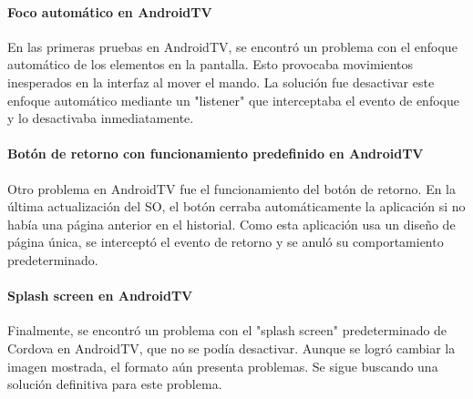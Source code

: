 \paragraph{Foco automático en AndroidTV}
En las primeras pruebas en AndroidTV, se encontró un problema con el enfoque automático de los elementos en la pantalla. 
Esto provocaba movimientos inesperados en la interfaz al mover el mando. La solución fue desactivar este enfoque 
automático mediante un "listener" que interceptaba el evento de enfoque y lo desactivaba inmediatamente.

\paragraph{Botón de retorno con funcionamiento predefinido en AndroidTV}
Otro problema en AndroidTV fue el funcionamiento del botón de retorno. En la última actualización del SO, el botón 
cerraba automáticamente la aplicación si no había una página anterior en el historial. Como esta aplicación usa 
un diseño de página única, se interceptó el evento de retorno y se anuló su comportamiento predeterminado.

\paragraph{Splash screen en AndroidTV}
Finalmente, se encontró un problema con el "splash screen" predeterminado de Cordova en AndroidTV, que no se podía 
desactivar. Aunque se logró cambiar la imagen mostrada, el formato aún presenta problemas. Se sigue buscando una 
solución definitiva para este problema.

